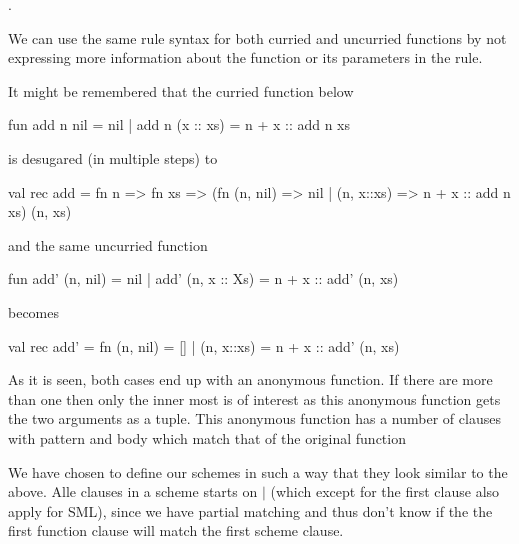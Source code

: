 
. 



We can use the same rule syntax for both curried and uncurried functions by not
expressing more information about the function or its parameters in the rule.

It might be remembered that the curried function below

\begin{sml}
fun add n nil       = nil
  | add n (x :: xs) = n + x :: add n xs
\end{sml}

is desugared (in multiple steps) to

\begin{sml}
val rec add = fn n => 
              fn xs => (fn (n, nil) => nil
                         | (n, x::xs) => n + x :: add n xs) (n, xs)
\end{sml} 

and the same uncurried function 

\begin{sml}
fun add' (n, nil)     = nil
  | add' (n, x :: Xs) = n + x :: add' (n, xs)
\end{sml}

becomes

\begin{sml}
val rec add' = fn (n, nil) = []
                | (n, x::xs) = n + x :: add' (n, xs)
\end{sml}

               

As it is seen, both cases end up with an anonymous function. If there are more
than one then only the inner most is of interest as this anonymous
function gets the two arguments as a tuple. This anonymous function has a number
of clauses with pattern and body which match that of the original function

We have chosen to define our schemes in such a way that they look similar to the
above. Alle clauses in a scheme starts on $|$ (which except for the first clause
also apply for SML), since we have partial matching and thus don't know if the
the first function clause will match the first scheme clause.

